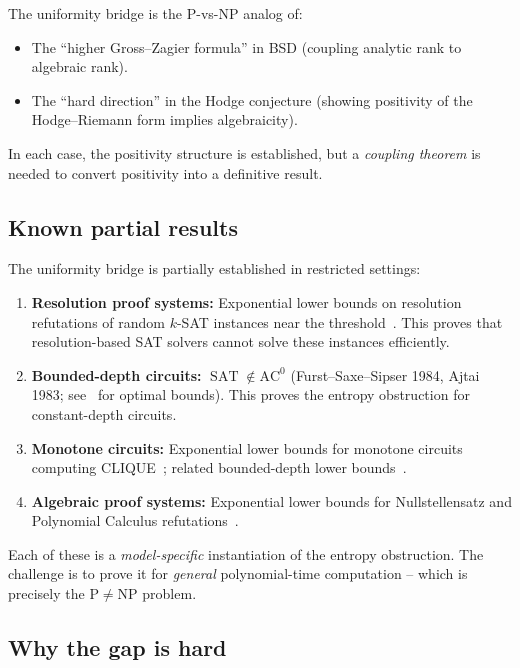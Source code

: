 \documentclass[aps,prd,twocolumn,superscriptaddress,nofootinbib]{revtex4-2}
\theoremstyle{definition}
\theoremstyle{remark}
\DeclareMathOperator{\SAT}{SAT}
\newcommand{\NP}{\mathrm{NP}}
\newcommand{\PP}{\mathrm{P}}
\begin{document}
The uniformity bridge is the $\PP$-vs-$\NP$ analog of:
\begin{itemize}
\item The ``higher Gross--Zagier formula'' in BSD (coupling analytic rank to algebraic rank).
\item The ``hard direction'' in the Hodge conjecture (showing positivity of the Hodge--Riemann form implies algebraicity).
\end{itemize}

In each case, the positivity structure is established, but a \textit{coupling theorem} is needed to convert positivity into a definitive result.

\subsection{Known partial results}

The uniformity bridge is partially established in restricted settings:

\begin{enumerate}
\item \textbf{Resolution proof systems:} Exponential lower bounds on resolution refutations of random $k$-SAT instances near the threshold~\cite{BenSasson2001}. This proves that resolution-based SAT solvers cannot solve these instances efficiently.

\item \textbf{Bounded-depth circuits:} $\SAT \notin \mathrm{AC}^0$ (Furst--Saxe--Sipser 1984, Ajtai 1983; see~\cite{Hastad1987} for optimal bounds). This proves the entropy obstruction for constant-depth circuits.

\item \textbf{Monotone circuits:} Exponential lower bounds for monotone circuits computing CLIQUE~\cite{Razborov1985}; related bounded-depth lower bounds~\cite{Razborov1987}.

\item \textbf{Algebraic proof systems:} Exponential lower bounds for Nullstellensatz and Polynomial Calculus refutations~\cite{Grigoriev2001}.
\end{enumerate}

Each of these is a \textit{model-specific} instantiation of the entropy obstruction. The challenge is to prove it for \textit{general} polynomial-time computation -- which is precisely the $\PP \neq \NP$ problem.

\subsection{Why the gap is hard}
\end{document}
